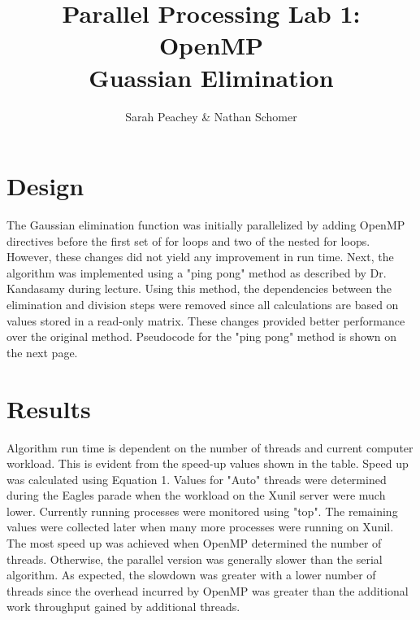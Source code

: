 \documentclass[12pt]{article}
\begin{document}
\title{Parallel Processing Lab 1: OpenMP \\ Guassian Elimination}
\author{Sarah Peachey \& Nathan Schomer}
\maketitle


\newpage

\vspace{-1.5cm}
\section{Design}
\vspace{-0.25cm}
The Gaussian elimination function was initially parallelized
by adding OpenMP directives before the first set of for loops
and two of the nested for loops. However, these changes did not
yield any improvement in run time. Next, the algorithm was
implemented using a "ping pong" method as described by Dr. Kandasamy
during lecture. Using this method, the dependencies between the
elimination and division steps were removed since all calculations
are based on values stored in a read-only matrix. These changes
provided better performance over the original method. Pseudocode for
the "ping pong" method is shown on the next page.

\vspace{-0.6cm}
\section{Results}
\vspace{-0.4cm}
\qquad Algorithm run time is dependent on the number
of threads and current computer workload.
This is evident from the speed-up values shown 
in the table. Speed up was calculated using Equation 1. 
Values for "Auto" threads were determined
during the Eagles parade when the workload on the Xunil server were
much lower. Currently running processes were monitored using "top".
The remaining values were collected later when many more 
processes were running on Xunil.
The most speed up was achieved when OpenMP determined
the number of threads. Otherwise, the parallel version was generally
slower than the serial algorithm. As expected, the slowdown was
greater with a lower number of threads since the overhead incurred by
OpenMP was greater than the additional work throughput gained by
additional threads. 
\end{document}
